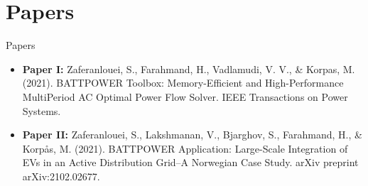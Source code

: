\documentclass[12pt]{beamer}
\begin{document}
\section{Papers}
\begin{frame}{Papers}
\centering \begin{block}{}
\begin{itemize}
\item<1-> \textbf{Paper I:} {\tiny Zaferanlouei, S., Farahmand, H., Vadlamudi, V. V., \& Korpas, M. (2021).} BATTPOWER Toolbox: Memory-Efficient and High-Performance MultiPeriod AC Optimal Power Flow Solver. IEEE Transactions on Power Systems.
\item<2-> \textbf{Paper II:} {\tiny Zaferanlouei, S., Lakshmanan, V., Bjarghov, S., Farahmand, H., \& Korpås, M. (2021).} BATTPOWER Application: Large-Scale Integration of EVs in an Active Distribution Grid--A Norwegian Case Study. arXiv preprint arXiv:2102.02677.
\end{itemize}
\end{block} 
\end{frame}
\end{document}
